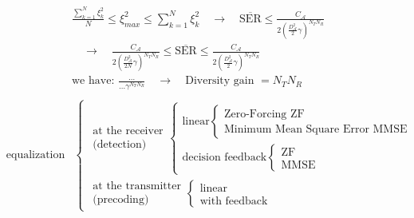 \begin{align*}
	& \frac{\sum\limits_{k=1}^N\xi_k^2}{N}\le\xi_{max}^2\le\sum\limits_{k=1}^N\xi_k^2\quad\rightarrow\quad\overline{\mathrm{SER}}\le\frac{C_\mathcal{A}}{2\left(\frac{D_\mathcal{A}^2}{2}\gamma\right)^{N_TN_R}} \\
	& \quad\rightarrow\quad\frac{C_\mathcal{A}}{2\left(\frac{D_\mathcal{A}^2}{2N}\gamma\right)^{N_TN_R}}\le\overline{\mathrm{SER}}\le\frac{C_\mathcal{A}}{2\left(\frac{D_\mathcal{A}^2}{2}\gamma\right)^{N_TN_R}} \\
	& \text{we have: }\frac{\ldots}{\ldots\gamma^{N_TN_R}}\quad\rightarrow\quad\text{Diversity gain $=N_TN_R$} \\
\end{align*}
\begin{align*}
	& \text{equalization}
	& \begin{cases}
		\substack{\text{at the receiver}\\ \text{(detection)}} 
			\begin{cases}
				\text{linear} 
					\begin{cases}
						\text{Zero-Forcing ZF} \\
						\text{Minimum Mean Square Error MMSE}
					\end{cases} \\
				\text{decision feedback}
					\begin{cases}
						\text{ZF} \\
						\text{MMSE}
					\end{cases}
			\end{cases} \\
		\substack{\text{at the transmitter}\\ \text{(precoding)}}
			\begin{cases}
				\text{linear} \\
				\text{with feedback}
			\end{cases}
	\end{cases} \\
\end{align*}
